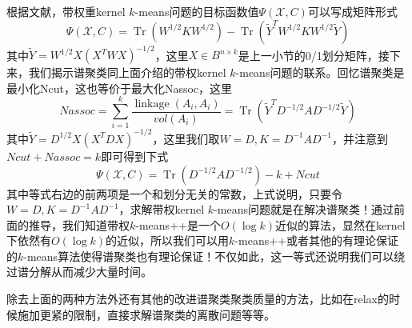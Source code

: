 根据文献\cite{dhillon2004unified}，带权重kernel $k$-means问题的目标函数值$\Psi(\mathcal{X},C)$可以写成矩阵形式
\begin{equation*}
	\Psi(\mathcal{X},C) = \operatorname{Tr}\left(W^{1 / 2} K W^{1 / 2}\right)-\operatorname{Tr}\left(\tilde{Y}^{T} W^{1 / 2} K W^{1 / 2} \tilde{Y}\right)
\end{equation*}
其中$\tilde{Y} = W^{1/2}X(X^TWX)^{-1/2}$，这里$X\in B^{n\times k}$是上一小节的0/1划分矩阵，接下来，我们揭示谱聚类同上面介绍的带权kernel $k$-means问题的联系。回忆谱聚类是最小化Ncut，这也等价于最大化Nassoc，这里
\begin{equation*}
	Nassoc=\sum_{i=1}^k \frac{\operatorname{linkage}(A_i,A_i)}{vol(A_i)} = \operatorname{Tr}(\tilde{Y}^TD^{-1/2}AD^{-1/2}\tilde{Y})
\end{equation*}
其中$\tilde{Y} = D^{1/2}X(X^TDX)^{-1/2}$，这里我们取$W=D,K=D^{-1}AD^{-1}$，并注意到$Ncut+Nassoc=k$即可得到下式
\begin{equation}
	\label{eq: wkk_spectral_clustering}
	\Psi(\mathcal{X},C) = \operatorname{Tr}\left(D^{-1 / 2} A D^{-1 / 2}\right) - k + Ncut
\end{equation}
其中等式右边的前两项是一个和划分无关的常数，上式说明，只要令$W=D,K=D^{-1}AD^{-1}$，求解带权kernel $k$-means问题就是在解决谱聚类！通过前面的推导，我们知道带权$k$-means++是一个$O(\log k)$近似的算法，显然在kernel下依然有$O(\log k)$的近似，所以我们可以用$k$-means++或者其他的有理论保证的$k$-means算法使得谱聚类也有理论保证！不仅如此，这一等式还说明我们可以绕过谱分解从而减少大量时间。

除去上面的两种方法外还有其他的改进谱聚类聚类质量的方法，比如在relax的时候施加更紧的限制\cite{yang2018new}，直接求解谱聚类的离散问题\cite{chen2018spectral}等等。

